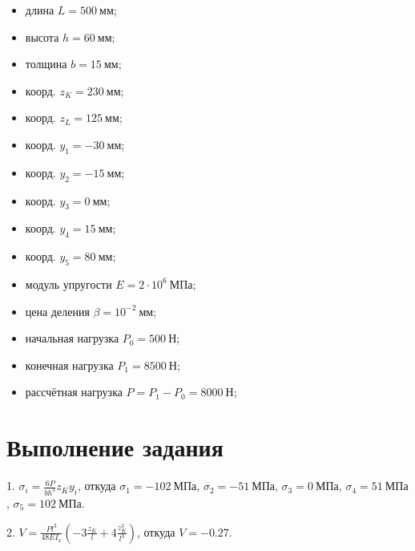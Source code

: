 \begin{itemize}
    \item длина $L = 500~мм$;
    \item высота $h = 60~мм$;
    \item толщина $b = 15~мм$;
    \item коорд. $z_K = 230~мм$;
    \item коорд. $z_L = 125~мм$;
    \item коорд. $y_1 = -30~мм$;
    \item коорд. $y_2 = -15~мм$;
    \item коорд. $y_3 = 0~мм$;
    \item коорд. $y_4 = 15~мм$;
    \item коорд. $y_5 = 80~мм$;
    \item модуль упругости $E = 2 \cdot 10^6~МПа$;
    \item цена деления $\beta = 10^{-2}~мм$;
    \item начальная нагрузка $P_0 = 500~Н$;
    \item конечная нагрузка $P_1 = 8500~Н$;
    \item рассчётная нагрузка $P = P_1 - P_0 = 8000~Н$;
\end{itemize}

\section{Выполнение задания}

1. $\sigma_i = \frac{6 P}{b h^3} z_K y_i$, откуда $\sigma_1 = -102~МПа$, $\sigma_2 = -51~МПа$, $\sigma_3 = 0~МПа$, $\sigma_4 = 51~МПа$, $\sigma_5 = 102~МПа$.

2. $V = \frac{P l^3}{48 E I_x} \left(-3 \frac{z_K}{l} + 4 \frac{z_K^3}{l^3}\right)$, откуда $V = -0.27$.

